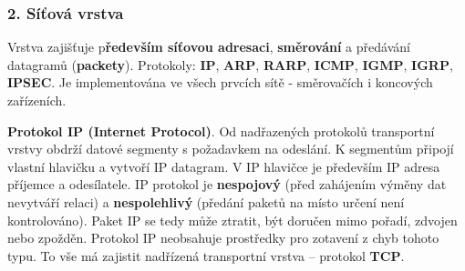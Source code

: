 \subsubsection*{2. Síťová vrstva}
Vrstva zajišťuje p\textbf{ředevším síťovou adresaci}, \textbf{směrování} a předávání datagramů (\textbf{packety}). Protokoly: \textbf{IP}, \textbf{ARP}, \textbf{RARP}, \textbf{ICMP}, \textbf{IGMP}, \textbf{IGRP}, \textbf{IPSEC}. Je implementována ve všech prvcích sítě - směrovačích i koncových zařízeních.

\textbf{Protokol IP (Internet Protocol)}. Od nadřazených protokolů transportní vrstvy obdrží datové segmenty s požadavkem na odeslání. K segmentům připojí vlastní hlavičku a vytvoří IP datagram. V IP hlavičce je především IP adresa příjemce a odesílatele. IP protokol je \textbf{nespojový} (před zahájením výměny dat nevytváří relaci) a \textbf{nespolehlivý} (předání paketů na místo určení není kontrolováno). Paket IP se tedy může ztratit, být doručen mimo pořadí, zdvojen nebo zpožděn. Protokol IP neobsahuje prostředky pro zotavení z chyb tohoto typu. To vše má zajistit nadřízená transportní vrstva – protokol \textbf{TCP}.

